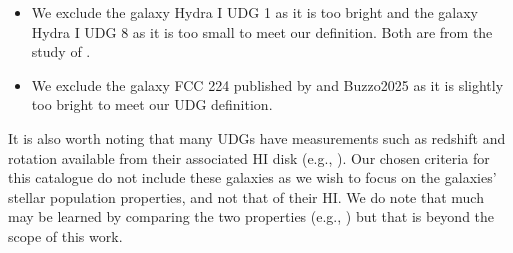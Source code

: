 \begin{itemize}
    \item We exclude the galaxy Hydra $\mathrm{I}$ UDG 1 as it is too bright and the galaxy Hydra $\mathrm{I}$ UDG 8 as it is too small to meet our definition. Both are from the study of \citet{Buttitta2025}.
    \item We exclude the galaxy FCC 224 published by \citet{Tang2025} and {Buzzo2025} as it is slightly too bright to meet our UDG definition. 
\end{itemize}

It is also worth noting that many UDGs have measurements such as redshift and rotation available from their associated HI disk (e.g., \citealt{Leisman2017, Spekkens2018, ManceraPina2019, ManceraPina2020, ManceraPina2022, Karunakaran2020, Gault2021, Kong2022, Obeirne2024}). Our chosen criteria for this catalogue do not include these galaxies as we wish to focus on the galaxies' stellar population properties, and not that of their HI. We do note that much may be learned by comparing the two properties (e.g., \citealp{KadoFong2022a, KadoFong2022b}) but that is beyond the scope of this work.
